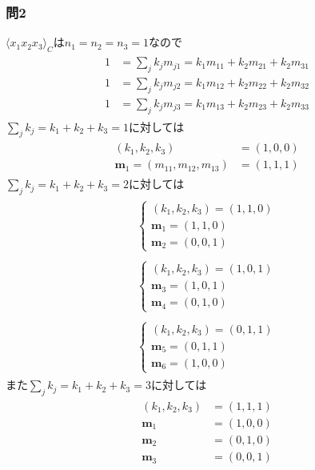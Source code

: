 \documentclass[uplatex,a4j,11pt,dvipdfmx]{jsarticle}
\begin{document}
\subsubsection*{問2}
$\langle x_1x_2x_3\rangle_C$は$n_1=n_2=n_3=1$なので
\begin{align}
  \begin{split}
    1&=\sum_jk_jm_{j1}=k_1m_{11}+k_2m_{21}+k_2m_{31}\\
    1&=\sum_jk_jm_{j2}=k_1m_{12}+k_2m_{22}+k_2m_{32}\\
    1&=\sum_jk_jm_{j3}=k_1m_{13}+k_2m_{23}+k_2m_{33}
  \end{split}
\end{align}
$\sum_jk_j=k_1+k_2+k_3=1$に対しては
\begin{align}
  \begin{split}
    (k_1,k_2,k_3)&=(1,0,0)\\
    {\bm m}_1=(m_{11},m_{12},m_{13})&=(1,1,1)
  \end{split}
\end{align}
$\sum_jk_j=k_1+k_2+k_3=2$に対しては
\begin{align}
  \begin{split}
    \left\{
      \begin{array}{c}
      (k_1,k_2,k_3)=(1,1,0)\\
      {\bm m}_1=(1,1,0)\\
      {\bm m}_2=(0,0,1)
    \end{array}\right.
  \end{split}\\
  \begin{split}
    \left\{
      \begin{array}{c}
        (k_1,k_2,k_3)=(1,0,1)\\
        {\bm m}_3=(1,0,1)\\
        {\bm m}_4=(0,1,0)
      \end{array}\right.
  \end{split}\\
  \begin{split}
    \left\{
      \begin{array}{c}
        (k_1,k_2,k_3)=(0,1,1)\\
        {\bm m}_5=(0,1,1)\\
        {\bm m}_6=(1,0,0)
      \end{array}\right.
  \end{split}
\end{align}
また$\sum_jk_j=k_1+k_2+k_3=3$に対しては
\begin{align}
  \begin{split}
    (k_1,k_2,k_3)&=(1,1,1)\\
    {\bm m}_1&=(1,0,0)\\
    {\bm m}_2&=(0,1,0)\\
    {\bm m}_3&=(0,0,1)
  \end{split}
\end{align}
\end{document}
